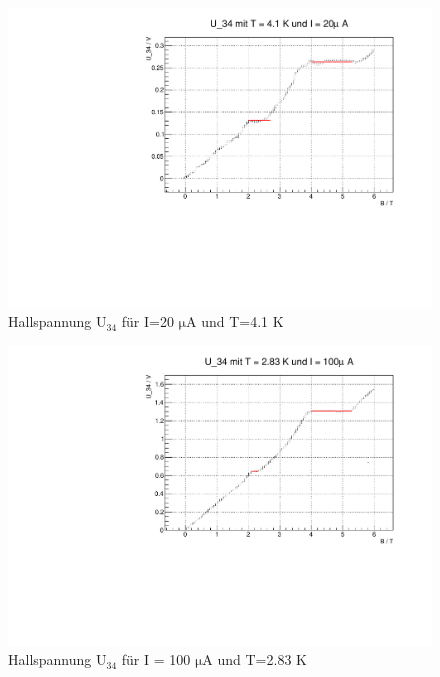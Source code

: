 \begin{figure}
\label{}
\centering
\includegraphics[scale = 0.5]{../plots/U_34_20muA_4100mK.pdf}
\caption{Hallspannung $\mathrm{U_{34}}$ für I=20 $\mathrm{\mu}$A und T=4.1 K}
\end{figure}

\newpage

\begin{figure}
\label{}
\centering
\includegraphics[scale = 0.5]{../plots/U_34_100muA_2830mK.pdf}
\caption{Hallspannung $\mathrm{U_{34}}$ für I = 100 $\mathrm{\mu}$A und T=2.83 K}
\end{figure}

